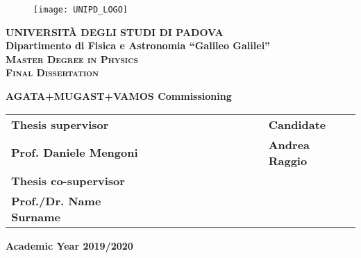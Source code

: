 \begin{titlepage}
\vspace{5mm}
\begin{figure}[hbtp]
\centering
\texttt{[image: UNIPD\_LOGO]}
\end{figure}
\vspace{5mm}
\begin{center}
{{\huge{\textsc{\bf UNIVERSIT\`A DEGLI STUDI DI PADOVA}}}\\}
\vspace{5mm}
{\Large{\bf Dipartimento di Fisica e Astronomia ``Galileo Galilei''}} \\
\vspace{5mm}
{\Large{\textsc{\bf Master Degree in Physics}}}\\
\vspace{20mm}
{\Large{\textsc{\bf Final Dissertation}}}\\
\vspace{30mm}
\begin{spacing}{3}
{\LARGE \textbf{AGATA+MUGAST+VAMOS Commissioning}}\\
\end{spacing}
\vspace{8mm}
\end{center}

\vspace{20mm}
\begin{spacing}{2}
\begin{tabular}{ l  c  c c c  cc c c c c  l }
{\Large{\bf Thesis supervisor}} &&&&&&&&&&& {\Large{\bf Candidate}}\\
{\Large{\bf Prof. Daniele Mengoni}} &&&&&&&&&&& {\Large{\bf Andrea Raggio}}\\
{\Large{\bf Thesis co-supervisor}}\\
{\Large{\bf Prof./Dr. Name Surname}}\\
\end{tabular}
\end{spacing}
\vspace{15 mm}

\begin{center}
{\Large{\bf Academic Year 2019/2020}}
\end{center}
\end{titlepage}
